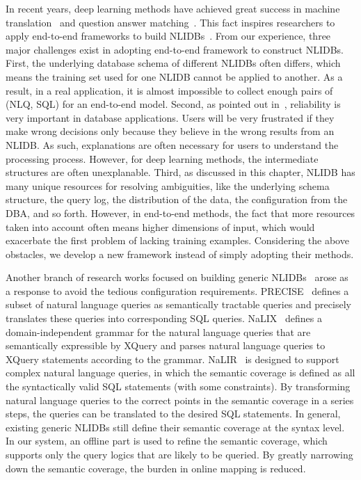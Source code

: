 \documentclass{vldb}
\begin{document}
In recent years, deep learning methods have achieved great success in machine translation~\cite{DBLP:journals/corr/WuSCLNMKCGMKSJL16} and question answer matching~\cite{DBLP:conf/acl/TanSXZ16,DBLP:conf/cikm/FengXZ16}.  This fact inspires researchers to apply end-to-end frameworks to build NLIDBs~\cite{DBLP:conf/acl/DongL16,DBLP:journals/debu/LuLK16,DBLP:journals/cacm/Liang16,DBLP:journals/tacl/ReddyTCKDSL16}.  From our experience, three major challenges exist in adopting end-to-end framework to construct NLIDBs.  First, the underlying database schema of different NLIDBs often differs, which means the training set used for one NLIDB cannot be applied to another.  As a result, in a real application, it is almost impossible to collect enough pairs of (NLQ, SQL) for an end-to-end model.  Second, as pointed out in~\cite{DBLP:conf/iui/PopescuEK03,DBLP:journals/pvldb/LiJ14}, reliability is very important in database applications.  Users will be very frustrated if they make wrong decisions only because they believe in the wrong results from an NLIDB.  As such, explanations are often necessary for users to understand the processing process.  However, for deep learning methods,  the intermediate structures are often unexplanable.  Third, as discussed in this chapter, NLIDB has many unique resources for resolving ambiguities, like the underlying schema structure, the query log, the distribution of the data, the configuration from the DBA, and so forth.  However, in end-to-end methods, the fact that more resources taken into account often means higher dimensions of input, which would exacerbate the first problem of lacking training examples.  Considering the above obstacles, we develop a new framework instead of simply adopting their methods.  

Another branch of research works focused on building generic NLIDBs~\cite{DBLP:conf/iui/PopescuEK03,DBLP:conf/coling/PopescuAEKY04,DBLP:journals/tods/LiYJ07,DBLP:journals/pvldb/LiJ14} arose as a response to avoid the tedious configuration requirements.  PRECISE~\cite{DBLP:conf/iui/PopescuEK03,DBLP:conf/coling/PopescuAEKY04} defines a subset of natural language queries as semantically tractable queries and precisely translates these queries into corresponding SQL queries.  NaLIX~\cite{DBLP:conf/sigmod/LiYJ05} defines a domain-independent grammar for the natural language queries that are semantically expressible by XQuery and parses natural language queries to XQuery statements according to the grammar.  NaLIR~\cite{DBLP:journals/pvldb/LiJ14} is designed to support complex natural language queries, in which the semantic coverage is defined as all the syntactically valid SQL statements (with some constraints).  By transforming natural language queries to the correct points in the semantic coverage in a series steps, the queries can be translated to the desired SQL statements.  In general, existing generic NLIDBs still define their semantic coverage at the syntax level.  In our system, an offline part is used to refine the semantic coverage, which supports only the query logics that are likely to be queried.  By greatly narrowing down the semantic coverage, the burden in online mapping is reduced.  
\end{document}
